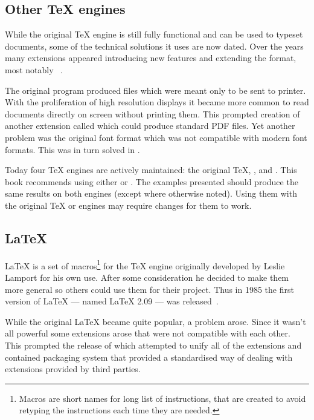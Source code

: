 \subsection{Other \TeX{} engines}

While the original \TeX{} engine is still fully functional and can be used to
typeset documents, some of the technical solutions it uses are now dated. Over
the years many extensions appeared introducing new features and extending the
format, most notably ~\cite{etex}.

The original program produced  files which were meant only to be sent
to printer. With the proliferation of high resolution displays it became more
common to read documents directly on screen without printing them. This
prompted creation of another extension called  which could
produce standard PDF files. Yet another problem was the original font format
which was not compatible with modern font formats. This was in turn solved in
.

Today four \TeX{} engines are actively maintained: the original \TeX{},
,  and . This book recommends using
either  or . The examples presented should produce
the same results on both engines (except where otherwise noted). Using them
with the original \TeX{} or  engines may require changes for
them to work.

\subsection{\LaTeX{}}

\LaTeX{} is a set of macros\footnote{Macros are short names for long list of
  instructions, that are created to avoid retyping the instructions each time
  they are needed.} for the \TeX{} engine originally developed by Leslie
Lamport for his own use. After some consideration he
decided to make them more general so others could use them for their project.
Thus in 1985 the first version of \LaTeX{} --- named \LaTeX{} 2.09 --- was
released~\cite{manual}.

While the original \LaTeX{} became quite popular, a problem arose. Since it
wasn't all powerful some extensions arose that were not compatible with each
other. This prompted the release of \LaTeXe{} which attempted to unify all of
the extensions and contained packaging system that provided a standardised way
of dealing with extensions provided by third parties.

